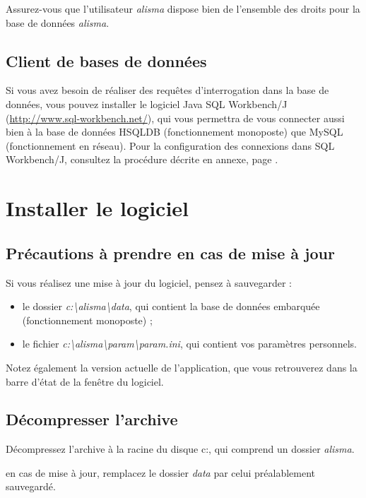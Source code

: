Assurez-vous que l'utilisateur \textit{alisma} dispose bien de l'ensemble des droits pour la base de données \textit{alisma}.

\subsection{Client de bases de données}

Si vous avez besoin de réaliser des requêtes d'interrogation dans la base de données, vous pouvez installer le logiciel Java SQL Workbench/J (\url{http://www.sql-workbench.net/}), qui vous permettra de vous connecter aussi bien à la base de données HSQLDB (fonctionnement monoposte) que MySQL (fonctionnement en réseau). Pour la configuration des connexions dans SQL Workbench/J, consultez la procédure décrite en annexe, page \pageref{sqlworkbenchj}.


\section{Installer le logiciel}

\subsection{Précautions à prendre en cas de mise à jour}
Si vous réalisez une mise à jour du logiciel, pensez à sauvegarder :
\begin{itemize}
\item le dossier \textit{\NoAutoSpaceBeforeFDP c:\textbackslash{}alisma\textbackslash{}data}, qui contient la base de données embarquée (fonctionnement monoposte) ;
\item le fichier \textit{\NoAutoSpaceBeforeFDP c:\textbackslash{}alisma\textbackslash{}param\textbackslash{}param.ini}, qui contient vos paramètres personnels.
\end{itemize}
Notez également la version actuelle de l'application, que vous retrouverez dans la barre d'état de la fenêtre du logiciel.

\subsection{Décompresser l'archive}

Décompressez l'archive à la racine du disque c:, qui comprend un dossier \textit{alisma}.

en cas de mise à jour, remplacez le dossier \textit{data} par celui préalablement sauvegardé.

